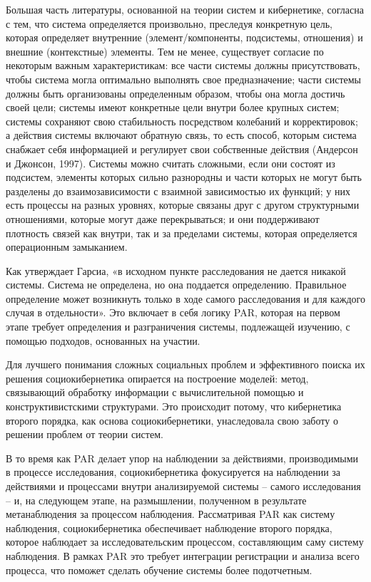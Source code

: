 \documentclass[a4page]{article}
\begin{document}
Большая часть литературы, основанной на теории систем и кибернетике, согласна с тем, что система определяется произвольно, преследуя конкретную цель, которая определяет внутренние (элемент/компоненты, подсистемы, отношения) и внешние (контекстные) элементы. Тем не менее, существует согласие по некоторым важным характеристикам: все части системы должны присутствовать, чтобы система могла оптимально выполнять свое предназначение; части системы должны быть организованы определенным образом, чтобы она могла достичь своей цели; системы имеют конкретные цели внутри более крупных систем; системы сохраняют свою стабильность посредством колебаний и корректировок; а действия системы включают обратную связь, то есть способ, которым система снабжает себя информацией и регулирует свои собственные действия (Андерсон и Джонсон, 1997). Системы можно считать сложными, если они состоят из подсистем, элементы которых сильно разнородны и части которых не могут быть разделены до взаимозависимости с взаимной зависимостью их функций; у них есть процессы на разных уровнях, которые связаны друг с другом структурными отношениями, которые могут даже перекрываться; и они поддерживают плотность связей как внутри, так и за пределами системы, которая определяется операционным замыканием\cite{sistemas_complejos}.

Как утверждает Гарсиа, «в исходном пункте расследования не дается никакой системы. Система не определена, но она поддается определению. Правильное определение может возникнуть только в ходе самого расследования и для каждого случая в отдельности». Это включает в себя логику PAR, которая на первом этапе требует определения и разграничения системы, подлежащей изучению, с помощью подходов, основанных на участии.

Для лучшего понимания сложных социальных проблем и эффективного поиска их решения социокибернетика опирается на построение моделей: метод, связывающий обработку информации с вычислительной помощью и конструктивистскими структурами. Это происходит потому, что кибернетика второго порядка, как основа социокибернетики, унаследовала свою заботу о решении проблем от теории систем.

В то время как PAR делает упор на наблюдении за действиями, производимыми в процессе исследования, социокибернетика фокусируется на наблюдении за действиями и процессами внутри анализируемой системы – самого исследования – и, на следующем этапе, на размышлении, полученном в результате метанаблюдения за процессом наблюдения. Рассматривая PAR как систему наблюдения, социокибернетика обеспечивает наблюдение второго порядка, которое наблюдает за исследовательским процессом, составляющим саму систему наблюдения. В рамках PAR это требует интеграции регистрации и анализа всего процесса, что поможет сделать обучение системы более подотчетным.
\end{document}
